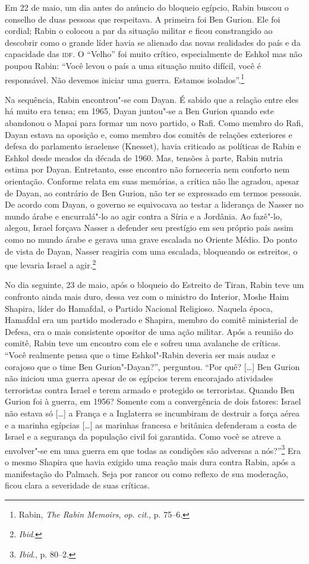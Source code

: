 Em 22 de maio, um dia antes do anúncio do bloqueio egípcio, Rabin buscou
o conselho de duas pessoas que respeitava. A primeira foi Ben Gurion.
Ele foi cordial; Rabin o colocou a par da situação militar e ficou
constrangido ao descobrir como o grande líder havia se alienado das
novas realidades do país e da capacidade das \textsc{idf}. O ``Velho'' foi muito
crítico, especialmente de Eshkol mas não poupou Rabin: ``Você levou o
país a uma situação muito difícil, você é responsável. Não devemos
iniciar uma guerra. Estamos isolados''.\footnote{Rabin, \emph{The Rabin Memoirs},
\emph{op}. \emph{cit}., p. 75--6.}

Na sequência, Rabin encontrou"-se com Dayan. É sabido que a relação entre eles
há muito era tensa; em 1965, Dayan juntou"-se a Ben Gurion quando
este abandonou o Mapai para formar um novo partido, o Rafi. Como membro
do Rafi, Dayan estava na oposição e, como membro dos comitês de relações
exteriores e defesa do parlamento israelense (Knesset), havia criticado as políticas de Rabin e
Eshkol desde meados da década de 1960. Mas, tensões à parte, Rabin
nutria estima por Dayan. Entretanto, esse encontro não forneceria nem
conforto nem orientação. Conforme relata em suas memórias, a crítica não
lhe agradou, apesar de Dayan, ao contrário de Ben Gurion, não ter se
expressado em termos pessoais. De acordo com Dayan, o governo se
equivocava ao testar a liderança de Nasser no mundo árabe e encurralá"-lo
ao agir contra a Síria e a Jordânia. Ao fazê"-lo, alegou, Israel forçava
Nasser a defender seu prestígio em seu próprio país assim como no mundo
árabe e gerava uma grave escalada no Oriente Médio. Do ponto de vista de
Dayan, Nasser reagiria com uma escalada, bloqueando os estreitos, o que
levaria Israel a agir.\footnote{\emph{Ibid}.}

No dia seguinte, 23 de maio, após o bloqueio do Estreito de Tiran, Rabin teve
um confronto ainda mais duro, dessa vez com o ministro do Interior,
Moshe Haim Shapira, líder do Hamafdal, o Partido Nacional Religioso.
Naquela época, Hamafdal era um partido
moderado e Shapira, membro do comitê ministerial de Defesa, era o mais
consistente opositor de uma ação militar. Após a reunião do comitê, Rabin
teve um encontro com ele e sofreu uma avalanche de críticas. ``Você
realmente pensa que o time Eshkol"-Rabin deveria ser mais audaz e
corajoso que o time Ben Gurion"-Dayan?'', perguntou. ``Por quê? {[}\ldots{}{]} Ben
Gurion não iniciou uma guerra apesar de os egípcios terem encorajado
atividades terroristas contra Israel e terem armado e protegido os
terroristas. Quando Ben Gurion foi à guerra, em 1956? Somente com a
convergência de dois fatores: Israel não estava só {[}\ldots{}{]} a França e a
Inglaterra se incumbiram de destruir a força aérea e a marinha
egípcias {[}\ldots{}{]} as marinhas francesa e britânica defenderam a costa de Israel
e a segurança da população civil foi garantida. Como você se atreve a
envolver"-se em uma guerra em que todas as condições são adversas a
nós?''\footnote{\emph{Ibid}., p. 80--2.} Era o mesmo Shapira que havia exigido uma reação mais
dura contra Rabin, após a manifestação do Palmach. Seja por rancor ou
como reflexo de sua moderação, ficou clara a severidade de suas
críticas.

